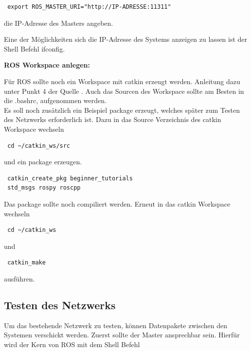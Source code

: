 \documentclass[12pt]{article}
\begin{document}
 \begin{lstlisting}
 export ROS_MASTER_URI="http://IP-ADRESSE:11311"
 \end{lstlisting}

die IP-Adresse des Masters angeben.

Eine der Möglichkeiten sich die IP-Adresse des Systems anzeigen zu lassen ist der Shell Befehl ifconfig.

{\bf ROS Workspace anlegen:}

Für ROS sollte noch ein Workspace mit catkin erzeugt werden.
Anleitung dazu unter Punkt 4 der Quelle \cite{Workspace}.
Auch das Sourcen des Workspace sollte am Besten in die .bashrc, aufgenommen werden. \\
Es soll noch zusätzlich ein Beispiel package erzeugt, welches später zum Testen des Netzwerks erforderlich ist.
Dazu in das Source Verzeichnis des catkin Workspace wechseln

 \begin{lstlisting}
 cd ~/catkin_ws/src
 \end{lstlisting}

und ein package erzeugen. 

 \begin{lstlisting}
 catkin_create_pkg beginner_tutorials
 std_msgs rospy roscpp
 \end{lstlisting}

Das package sollte noch compiliert werden.
Erneut in  das catkin Workspace wechseln

 \begin{lstlisting}
 cd ~/catkin_ws
 \end{lstlisting}

und  
 
 \begin{lstlisting}
 catkin_make
 \end{lstlisting}
 
ausführen.
\subsection{Testen des Netzwerks}

Um das bestehende Netzwerk zu testen, können Datenpakete zwischen den Systemen verschickt werden.
Zuerst sollte der Master ansprechbar sein.
Hierfür wird der Kern von ROS mit dem Shell Befehl 
\end{document}

